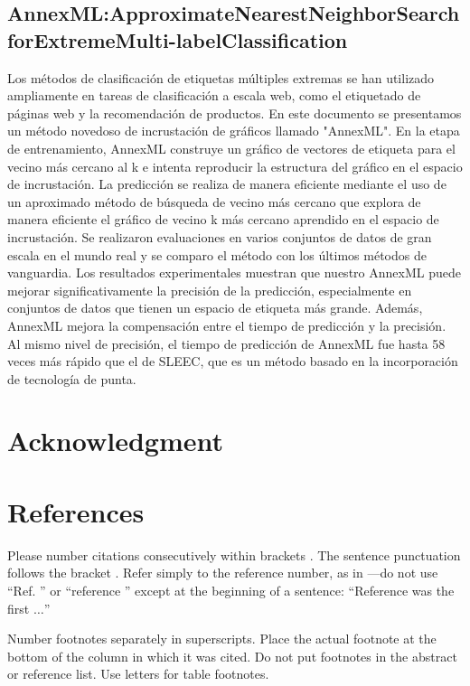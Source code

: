 \documentclass[conference]{IEEEtran}
\begin{document}
\subsection{AnnexML:ApproximateNearestNeighborSearch forExtremeMulti-labelClassification }

Los métodos de clasificación de etiquetas múltiples extremas se han utilizado ampliamente en tareas de clasificación a escala web, como el etiquetado de páginas web y la recomendación de productos. En este documento se presentamos un método novedoso de incrustación de gráficos llamado "AnnexML". En la etapa de entrenamiento, AnnexML construye un gráfico de vectores de etiqueta para el vecino más cercano al k e intenta reproducir la estructura del gráfico en el espacio de incrustación.
La predicción se realiza de manera eficiente mediante el uso de un aproximado
método de búsqueda de vecino más cercano que explora de manera eficiente el gráfico de vecino k más cercano aprendido en el espacio de incrustación. Se realizaron evaluaciones en varios conjuntos de datos de gran escala en el mundo real y se comparo el método con los últimos métodos de vanguardia. Los resultados experimentales muestran que nuestro AnnexML puede mejorar significativamente la precisión de la predicción, especialmente en conjuntos de datos que tienen un espacio de etiqueta más grande. Además, AnnexML mejora la compensación entre el tiempo de predicción y la precisión. Al mismo nivel de precisión, el tiempo de predicción de AnnexML fue hasta 58 veces más rápido que el de SLEEC, que es un método basado en la incorporación de tecnología de punta.



\section*{Acknowledgment}


\section*{References}

Please number citations consecutively within brackets \cite{b1}. The 
sentence punctuation follows the bracket \cite{b2}. Refer simply to the reference 
number, as in \cite{b3}---do not use ``Ref. \cite{b3}'' or ``reference \cite{b3}'' except at 
the beginning of a sentence: ``Reference \cite{b3} was the first $\ldots$''

Number footnotes separately in superscripts. Place the actual footnote at 
the bottom of the column in which it was cited. Do not put footnotes in the 
abstract or reference list. Use letters for table footnotes.
\end{document}
